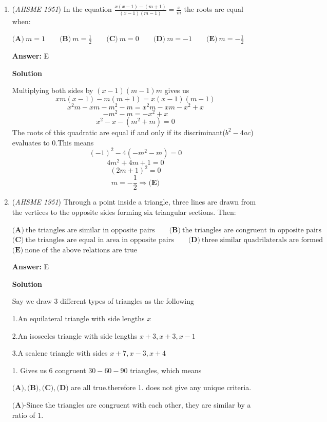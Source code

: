 \begin{enumerate}
 


	\item (\textit{AHSME 1951}) In the equation $\frac{x(x-1)-(m+1)}{(x-1)(m-1)}=\frac{x}{m}$ the roots are equal when:


 $\textbf{(A)}\ m = 1\qquad\textbf{(B)}\ m =\frac{1}{2}\qquad\textbf{(C)}\ m = 0\qquad\textbf{(D)}\ m =-1\qquad\textbf{(E)}\ m =-\frac{1}{2}$

 \textbf{Answer: }E



\textbf{Solution}

Multiplying both sides by $(x-1)(m-1)m$ gives us
 \[xm(x-1)-m(m+1)=x(x-1)(m-1)\]
 \[x^2m-xm-m^2-m=x^2m-xm-x^2+x\]
 \[-m^2-m=-x^2+x\]
 \[x^2-x-(m^2+m)=0\]The roots of this quadratic are equal if and only if its discriminant($b^2-4ac$) evaluates to 0.This means
 \[(-1)^2-4(-m^2-m)=0\]
 \[4m^2+4m+1=0\]
 \[(2m+1)^2=0\]
 \[m=-\frac{1}{2} \Rightarrow \boxed{\textbf{(E)}}\]



	\item (\textit{AHSME 1951}) Through a point inside a triangle, three lines are drawn from the vertices to the opposite sides forming six triangular sections. Then: 


 $\textbf{(A)}\ \text{the triangles are similar in opposite pairs}\qquad\textbf{(B)}\ \text{the triangles are congruent in opposite pairs}$
$\textbf{(C)}\ \text{the triangles are equal in area in opposite pairs}\qquad\textbf{(D)}\ \text{three similar quadrilaterals are formed}$
$\textbf{(E)}\ \text{none of the above relations are true}$

 \textbf{Answer: }E



\textbf{Solution}

Say we draw 3 different types of triangles as the following

 1.An equilateral triangle with side lengths $x$

 2.An isosceles triangle with side lengths $x+3,x+3,x-1$

 3.A scalene triangle with sides $x+7,x-3,x+4$

 1. Gives us 6 congruent $30-60-90$ triangles, which means

 $\textbf{(A)},\textbf{(B)},\textbf{(C)},\textbf{(D)}$ are all true.therefore 1. does not give any unique criteria.

 $\textbf{(A)}$-Since the triangles are congruent with each other, they are similar by a ratio of $1$.


\end{enumerate}
